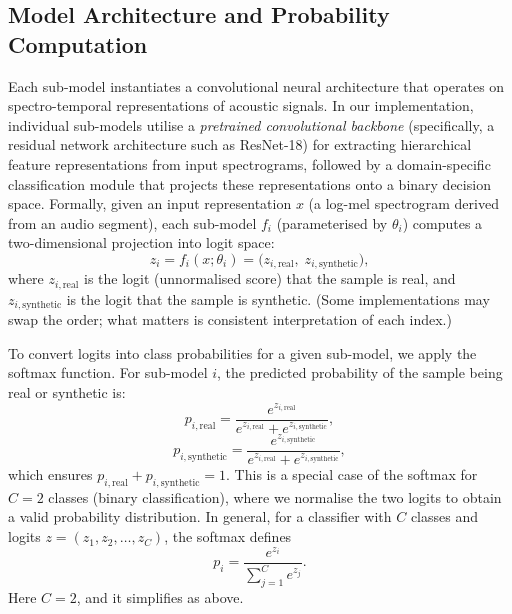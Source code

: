 \documentclass[conference]{IEEEtran}  %
\begin{document}
\subsection{Model Architecture and Probability Computation}
Each sub-model instantiates a convolutional neural architecture that operates on spectro-temporal representations of acoustic signals. In our implementation, individual sub-models utilise a \emph{pretrained convolutional backbone} (specifically, a residual network architecture such as ResNet-18) for extracting hierarchical feature representations from input spectrograms, followed by a domain-specific classification module that projects these representations onto a binary decision space. Formally, given an input representation \(x\) (a log-mel spectrogram derived from an audio segment), each sub-model \(f_i\) (parameterised by \(\theta_i\)) computes a two-dimensional projection into logit space:
\begin{equation}
\label{eq:submodel_output}
z_i = f_i(x; \theta_i) = \bigl(z_{i,\text{real}}, \; z_{i,\text{synthetic}}\bigr),
\end{equation}
where \(z_{i,\text{real}}\) is the logit (unnormalised score) that the sample is real, and \(z_{i,\text{synthetic}}\) is the logit that the sample is synthetic. (Some implementations may swap the order; what matters is consistent interpretation of each index.)

To convert logits into class probabilities for a given sub-model, we apply the softmax function. For sub-model \(i\), the predicted probability of the sample being real or synthetic is:
\begin{equation}
\label{eq:submodel_prob_real}
p_{i,\text{real}} = \frac{e^{z_{i,\text{real}}}}{e^{z_{i,\text{real}}} + e^{z_{i,\text{synthetic}}}},
\end{equation}
\begin{equation}
\label{eq:submodel_prob_synthetic}
p_{i,\text{synthetic}} = \frac{e^{z_{i,\text{synthetic}}}}{e^{z_{i,\text{real}}} + e^{z_{i,\text{synthetic}}}},
\end{equation}
which ensures \(p_{i,\text{real}} + p_{i,\text{synthetic}} = 1\). This is a special case of the softmax for \(C=2\) classes (binary classification), where we normalise the two logits to obtain a valid probability distribution. In general, for a classifier with \(C\) classes and logits \(z = (z_1, z_2, \dots, z_C)\), the softmax defines
\begin{equation}
\label{eq:softmax_general}
p_i = \frac{e^{z_i}}{\sum_{j=1}^{C} e^{z_j}}.
\end{equation}
Here \(C=2\), and it simplifies as above.
\end{document}

